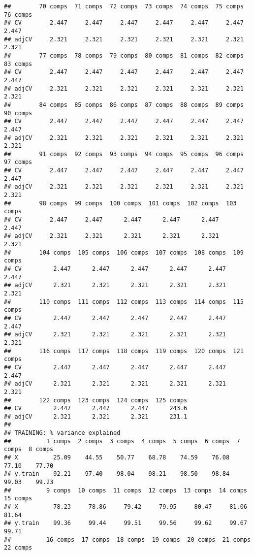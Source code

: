 \documentclass[
]{article}
\begin{document}
\begin{verbatim}
##        70 comps  71 comps  72 comps  73 comps  74 comps  75 comps  76 comps
## CV        2.447     2.447     2.447     2.447     2.447     2.447     2.447
## adjCV     2.321     2.321     2.321     2.321     2.321     2.321     2.321
##        77 comps  78 comps  79 comps  80 comps  81 comps  82 comps  83 comps
## CV        2.447     2.447     2.447     2.447     2.447     2.447     2.447
## adjCV     2.321     2.321     2.321     2.321     2.321     2.321     2.321
##        84 comps  85 comps  86 comps  87 comps  88 comps  89 comps  90 comps
## CV        2.447     2.447     2.447     2.447     2.447     2.447     2.447
## adjCV     2.321     2.321     2.321     2.321     2.321     2.321     2.321
##        91 comps  92 comps  93 comps  94 comps  95 comps  96 comps  97 comps
## CV        2.447     2.447     2.447     2.447     2.447     2.447     2.447
## adjCV     2.321     2.321     2.321     2.321     2.321     2.321     2.321
##        98 comps  99 comps  100 comps  101 comps  102 comps  103 comps
## CV        2.447     2.447      2.447      2.447      2.447      2.447
## adjCV     2.321     2.321      2.321      2.321      2.321      2.321
##        104 comps  105 comps  106 comps  107 comps  108 comps  109 comps
## CV         2.447      2.447      2.447      2.447      2.447      2.447
## adjCV      2.321      2.321      2.321      2.321      2.321      2.321
##        110 comps  111 comps  112 comps  113 comps  114 comps  115 comps
## CV         2.447      2.447      2.447      2.447      2.447      2.447
## adjCV      2.321      2.321      2.321      2.321      2.321      2.321
##        116 comps  117 comps  118 comps  119 comps  120 comps  121 comps
## CV         2.447      2.447      2.447      2.447      2.447      2.447
## adjCV      2.321      2.321      2.321      2.321      2.321      2.321
##        122 comps  123 comps  124 comps  125 comps
## CV         2.447      2.447      2.447      243.6
## adjCV      2.321      2.321      2.321      231.1
## 
## TRAINING: % variance explained
##          1 comps  2 comps  3 comps  4 comps  5 comps  6 comps  7 comps  8 comps
## X          25.09    44.55    50.77    68.78    74.59    76.08    77.10    77.70
## y.train    92.21    97.40    98.04    98.21    98.50    98.84    99.03    99.23
##          9 comps  10 comps  11 comps  12 comps  13 comps  14 comps  15 comps
## X          78.23     78.86     79.42     79.95     80.47     81.06     81.64
## y.train    99.36     99.44     99.51     99.56     99.62     99.67     99.71
##          16 comps  17 comps  18 comps  19 comps  20 comps  21 comps  22 comps

\end{verbatim}
\end{document}
